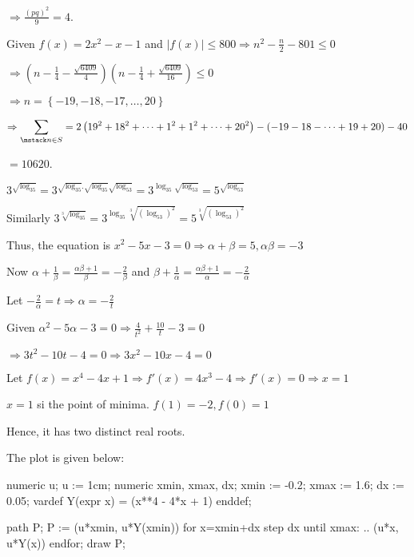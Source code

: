   $\Rightarrow \frac{(pq)^2}{9} = 4$.
\item Given $f(x) = 2x^2 - x - 1$ and $|f(x)|\leq 800 \Rightarrow n^2 -\frac{n}{2} - 801\leq 0$

  $\Rightarrow \left(n - \frac{1}{4} - \frac{\sqrt{6409}}{4}\right)\left(n - \frac{1}{4} +
  \frac{\sqrt{6409}}{16}\right) \leq 0$

  $\Rightarrow n = \left\{-19, -18, -17, \ldots, 20\right\}$

  $\Rightarrow \displaystyle\sum_{\mstack n\in S} = 2\left(19^2 + 18^2 + \cdots + 1^2 + 1^2 + \cdots +
  20^2\right) - (-19 - 18 -\cdots + 19 + 20) - 40$

  $= 10620$.
\item $3^{\sqrt{\log_35}} = 3^{\sqrt{\log_35}.\sqrt{\log_35}\sqrt{\log_53}} = 3^{\log_35\sqrt{\log_53}} =
  5^{\sqrt{\log_53}}$

  Similarly $3^{\sqrt[3]{\log_35}} = 3^{\log_35\sqrt[3]{\left(\log_53\right)^2}} =
  5^{\sqrt[3]{\left(\log_53\right)^2}}$

  Thus, the equation is $x^2 - 5x - 3 =0\Rightarrow \alpha + \beta = 5, \alpha\beta = -3$

  Now $\alpha + \frac{1}{\beta} = \frac{\alpha\beta + 1}{\beta} = -\frac{2}{\beta}$ and $\beta +
  \frac{1}{\alpha} = \frac{\alpha\beta + 1}{\alpha} = -\frac{2}{\alpha}$

  Let $-\frac{2}{\alpha} = t\Rightarrow \alpha = -\frac{2}{t}$

  Given $\alpha^2 - 5\alpha - 3 = 0\Rightarrow \frac{4}{t^2}+ \frac{10}{t} - 3 = 0$

  $\Rightarrow 3t^2 - 10t - 4 = 0\Rightarrow 3x^2 - 10x -4 = 0$
\item Let $f(x) = x^4 - 4x + 1\Rightarrow f'(x) = 4x^3 - 4\Rightarrow f'(x) = 0 \Rightarrow x = 1$

  $x = 1$ si the point of minima. $f(1) = -2, f(0) = 1$

  Hence, it has two distinct real roots.

  The plot is given below:

  \startplacefigure[location=force]
    \startMPcode
      numeric u; u := 1cm;     %
      numeric xmin, xmax, dx;
      xmin := -0.2; xmax := 1.6; dx := 0.05;
      vardef Y(expr x) = (x**4 - 4*x + 1) enddef;

      path P;
      P := (u*xmin, u*Y(xmin))
      for x=xmin+dx step dx until xmax:
      .. (u*x, u*Y(x))
      endfor;
      draw P;

